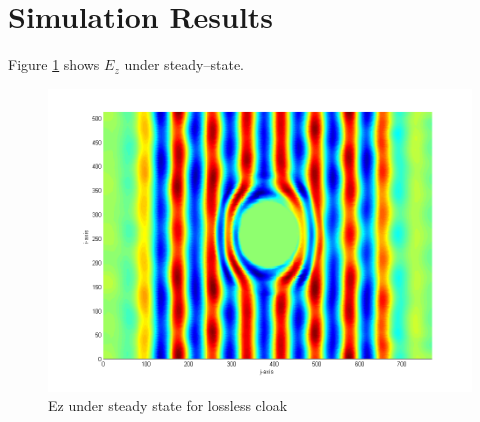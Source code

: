\section{Simulation Results}
Figure \ref{fig:Ez-Cloak-SteadyStateLossless} shows $E_z$ under steady--state.
\begin{figure}[H]
\centering
\includegraphics[scale=0.4]{Figures/FigCh05_Ez_Cloak_SteadyStateLossless.png}
\caption{Ez under steady state for lossless cloak}
\label{fig:Ez-Cloak-SteadyStateLossless}
\end{figure}